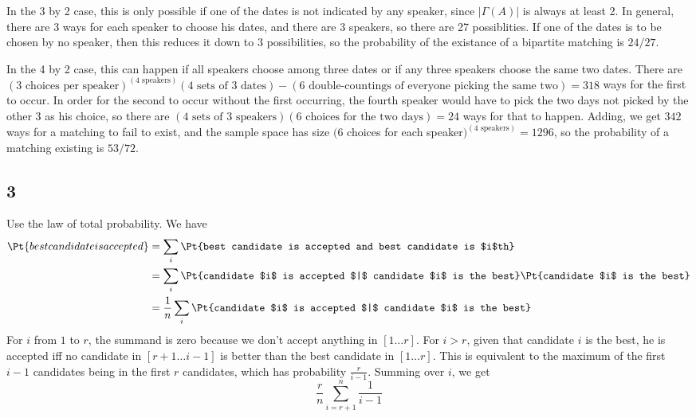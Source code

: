 \documentclass{article}
\begin{document}
In the 3 by 2 case, this is only possible if one of the dates is not indicated by any speaker, since $|\Gamma(A)|$ is always at least 2. In general, there are 3 ways for each speaker to choose his dates, and there are 3 speakers, so there are 27 possiblities. If one of the dates is to be chosen by no speaker, then this reduces it down to 3 possibilities, so the probability of the existance of a bipartite matching is $24/27$.

In the 4 by 2 case, this can happen if all speakers choose among three dates or if any three speakers choose the same two dates. There are $(3\text{ choices per speaker})^{(4\text{ speakers})}(4\text{ sets of 3 dates})-(6\text{ double-countings of everyone picking the same two})=318$ ways for the first to occur. In order for the second to occur without the first occurring, the fourth speaker would have to pick the two days not picked by the other 3 as his choice, so there are $(4\text{ sets of 3 speakers})(6\text{ choices for the two days})=24$ ways for that to happen. Adding, we get $342$ ways for a matching to fail to exist, and the sample space has size $($6 choices for each speaker$)^{(4\text{ speakers})}=1296$, so the probability of a matching existing is $53/72$.

\subsection*{3}
Use the law of total probability. We have 
\begin{align*}
\Pt{best candidate is accepted}&=\sum_i\Pt{best candidate is accepted and best candidate is $i$th}\\
&=\sum_i\Pt{candidate $i$ is accepted $|$ candidate $i$ is the best}\Pt{candidate $i$ is the best}\\
&=\frac{1}{n}\sum_i\Pt{candidate $i$ is accepted $|$ candidate $i$ is the best}
\end{align*}
For $i$ from $1$ to $r$, the summand is zero because we don't accept anything in $[1\ldots r]$. For $i>r$, given that candidate $i$ is the best, he is accepted iff no candidate in $[r+1\ldots i-1]$ is better than the best candidate in $[1\ldots r]$. This is equivalent to the maximum of the first $i-1$ candidates being in the first $r$ candidates, which has probability $\frac{r}{i-1}$. Summing over $i$, we get 
$$\frac{r}{n}\sum_{i=r+1}^n\frac{1}{i-1}$$
\end{document}
